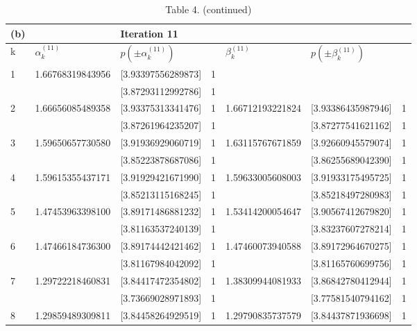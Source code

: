 \documentclass[10pt]{article}
\begin{document}
\begin{table}[h]
\begin{center}
\captionsetup{labelformat=empty}
\caption{Table 4. (continued)}
\begin{tabular}{|l|l|l|l|l|l|l|}
\hline
(b) &  & Iteration 11 &  &  &  &  \\
\hline
k & $\alpha_{k}^{(11)}$ & $p\left( \pm \alpha_{k}^{(11)}\right)$ &  & $\beta_{k}^{(11)}$ & $p\left( \pm \beta_{k}^{(11)}\right)$ &  \\
\hline
\multirow[t]{2}{*}{1} & \multirow[t]{2}{*}{1.66768319843956} & [3.93397556289873] & 1 &  &  &  \\
\hline
 &  & [3.87293112992786] & 1 &  &  &  \\
\hline
\multirow[t]{2}{*}{2} & \multirow[t]{2}{*}{1.66656085489358} & [3.93375313341476] & 1 & 1.66712193221824 & [3.93386435987946] & 1 \\
\hline
 &  & [3.87261964235207] & 1 &  & [3.87277541621162] & 1 \\
\hline
\multirow[t]{2}{*}{3} & \multirow[t]{2}{*}{1.59650657730580} & [3.91936929060719] & 1 & 1.63115767671859 & [3.92660945579074] & 1 \\
\hline
 &  & [3.85223878687086] & 1 &  & [3.86255689042390] & 1 \\
\hline
\multirow[t]{2}{*}{4} & \multirow[t]{2}{*}{1.59615355437171} & [3.91929421671990] & 1 & 1.59633005608003 & [3.91933175495725] & 1 \\
\hline
 &  & [3.85213115168245] & 1 &  & [3.85218497280983] & 1 \\
\hline
\multirow[t]{2}{*}{5} & \multirow[t]{2}{*}{1.47453963398100} & [3.89171486881232] & 1 & 1.53414200054647 & [3.90567412679820] & 1 \\
\hline
 &  & [3.81163537240139] & 1 &  & [3.83237607278214] & 1 \\
\hline
\multirow[t]{2}{*}{6} & \multirow[t]{2}{*}{1.47466184736300} & [3.89174442421462] & 1 & 1.47460073940588 & [3.89172964670275] & 1 \\
\hline
 &  & [3.81167984042092] & 1 &  & [3.81165760699756] & 1 \\
\hline
\multirow[t]{2}{*}{7} & \multirow[t]{2}{*}{1.29722218460831} & [3.84417472354802] & 1 & 1.38309944081933 & [3.86842780412944] & 1 \\
\hline
 &  & [3.73669028971893] & 1 &  & [3.77581540794162] & 1 \\
\hline
\multirow[t]{2}{*}{8} & \multirow[t]{2}{*}{1.29859489309811} & [3.84458264929519] & 1 & 1.29790835737579 & [3.84437871936698] & 1 \\

\end{tabular}
\end{center}
\end{table}
\end{document}
